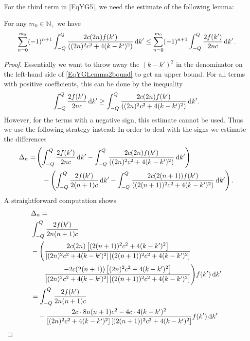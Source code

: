 For the third term in \eqref{EqYG5}, we need the estimate of the following lemma:
\begin{lemma} \label{LemmaYGbound:f}
	For any $ m_0\in\mathbb{N}_+ $ we have 
	\begin{equation}\label{EqYGLemma2bound}
		\sum_{n=0}^{m_0}(-1)^{n+1}\int_{-Q}^{Q}\frac{2c(2n) f(k')}{((2n)^2c^2+4(k-k')^2)}\mathop{}\!\mathrm{d} k'\leq \sum_{n=0}^{m_0}(-1)^{n+1}\int_{-Q}^{Q}\frac{2 f(k')}{2nc}\mathop{}\!\mathrm{d} k'.
	\end{equation}
\end{lemma}
\begin{proof}
Essentially we want to throw away the $ (k-k')^2 $ in the denominator on the left-hand side of \eqref{EqYGLemma2bound} to get an upper bound. For all terms with positive coefficients, this can be done by the inequality
\begin{equation}\label{EqYGLemma2bound2}
\int_{-Q}^{Q}\frac{2 f(k')}{2nc}\mathop{}\!\mathrm{d} k'\geq \int_{-Q}^{Q}\frac{2c(2n) f(k')}{((2n)^2c^2+4(k-k')^2)}\mathop{}\!\mathrm{d} k'.
\end{equation}
However, for the terms with a negative sign, this estimate cannot be used. Thus we use the following strategy instead:
 In order to deal with the signs we estimate the differences
\begin{equation}
	\begin{aligned}
	\Delta_n=&\left(\int_{-Q}^{Q}\frac{2 f(k')}{2nc}\mathop{}\!\mathrm{d} k'-\int_{-Q}^{Q}\frac{2c(2n) f(k')}{((2n)^2c^2+4(k-k')^2)}\mathop{}\!\mathrm{d} k'\right)\\
	&\quad-\left(\int_{-Q}^{Q}\frac{2 f(k')}{2(n+1)c}\mathop{}\!\mathrm{d} k'-\int_{-Q}^{Q}\frac{2c(2(n+1)) f(k')}{((2(n+1))^2c^2+4(k-k')^2)}\mathop{}\!\mathrm{d} k'\right).
	\end{aligned}
\end{equation}
A straightforward computation shows\begin{equation}
\begin{aligned}
&\Delta_n=\\
&\int_{-Q}^{Q} \frac{2 f(k')}{2n(n+1)c}\\&-\Bigg(\frac{2c(2n)\left[(2(n+1))^2c^2+4(k-k')^2\right]}{\left[(2n)^2c^2+4(k-k')^2\right]\left[(2(n+1))^2c^2+4(k-k')^2\right]}\\
&\qquad \frac{-2c(2(n+1))\left[(2n)^2c^2+4(k-k')^2\right]}{\left[(2n)^2c^2+4(k-k')^2\right]\left[(2(n+1))^2c^2+4(k-k')^2\right]}\Bigg) f(k')\diff k'\\
&=\int_{-Q}^{Q}\frac{2 f(k')}{2n(n+1)c}\\&\quad -\frac{2c\cdot  8n (n+1)c^2-4c\cdot 4(k-k')^2}{\left[(2n)^2c^2+4(k-k')^2\right]\left[(2(n+1))^2c^2+4(k-k')^2\right]} f(k')\diff k'\\

\end{aligned}
\end{equation}
\end{proof}
